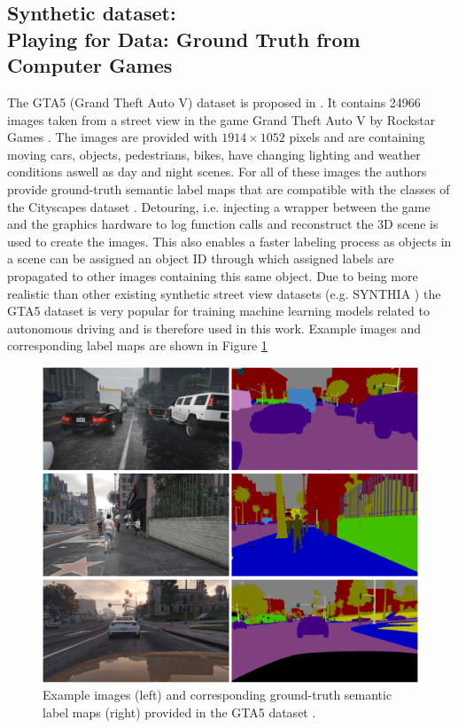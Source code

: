 \subsection{Synthetic dataset:\\
	Playing for Data: Ground Truth from Computer Games}

The GTA5 (Grand Theft Auto V) dataset is proposed in \cite{Richter_2016_ECCV}. It contains 24966 images taken from a street view in the game Grand Theft Auto V by Rockstar Games \cite{GTAV}. The images are provided with $1914 \times 1052$ pixels and are containing moving cars, objects, pedestrians, bikes, have changing lighting and weather conditions aswell as day and night scenes. For all of these images the authors provide ground-truth semantic label maps that are compatible with the classes of the Cityscapes dataset \cite{Cordts_2016_CVPR}. Detouring, i.e. injecting a wrapper between the game and the graphics hardware to log function calls and reconstruct the 3D scene is used to create the images. This also enables a faster labeling process as objects in a scene can be assigned an object ID through which assigned labels are propagated to other images containing this same object. Due to being more realistic than other existing synthetic street view datasets (e.g. SYNTHIA \cite{RosCVPR16}) the GTA5 dataset is very popular for training machine learning models related to autonomous driving and is therefore used in this work. Example images and corresponding label maps are shown in Figure \ref{fig:p4d_examples} 


\begin{figure}
	\centering
	\includegraphics[width=\textwidth]{images/p4d_example.png}
	\caption{Example images (left) and corresponding ground-truth semantic label maps (right) provided in the GTA5 dataset \cite{Richter_2016_ECCV}.}
	\label{fig:p4d_examples}
\end{figure}

